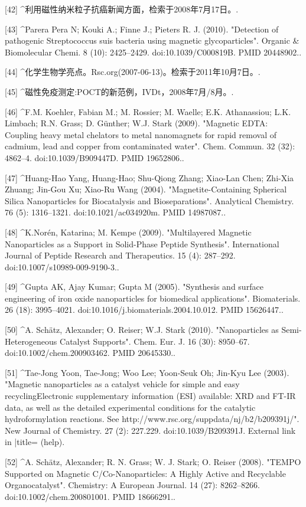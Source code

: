[42]
^利用磁性纳米粒子抗癌新闻方面，检索于2008年7月17日。.

[43]
^Parera Pera N; Kouki A.; Finne J.; Pieters R. J. (2010). "Detection of pathogenic Streptococcus suis bacteria using magnetic glycoparticles". Organic & Biomolecular Chemi. 8 (10): 2425–2429. doi:10.1039/C000819B. PMID 20448902..

[44]
^化学生物学亮点。Rsc.org(2007-06-13)。检索于2011年10月7日。.

[45]
^磁性免疫测定:POCT的新范例，IVDt，2008年7月/8月。.

[46]
^F.M. Koehler, Fabian M.; M. Rossier; M. Waelle; E.K. Athanassiou; L.K. Limbach; R.N. Grass; D. Günther; W.J. Stark (2009). "Magnetic EDTA: Coupling heavy metal chelators to metal nanomagnets for rapid removal of cadmium, lead and copper from contaminated water". Chem. Commun. 32 (32): 4862–4. doi:10.1039/B909447D. PMID 19652806..

[47]
^Huang-Hao Yang, Huang-Hao; Shu-Qiong Zhang; Xiao-Lan Chen; Zhi-Xia Zhuang; Jin-Gou Xu; Xiao-Ru Wang (2004). "Magnetite-Containing Spherical Silica Nanoparticles for Biocatalysis and Bioseparations". Analytical Chemistry. 76 (5): 1316–1321. doi:10.1021/ac034920m. PMID 14987087..

[48]
^K.Norén, Katarina; M. Kempe (2009). "Multilayered Magnetic Nanoparticles as a Support in Solid-Phase Peptide Synthesis". International Journal of Peptide Research and Therapeutics. 15 (4): 287–292. doi:10.1007/s10989-009-9190-3..

[49]
^Gupta AK, Ajay Kumar; Gupta M (2005). "Synthesis and surface engineering of iron oxide nanoparticles for biomedical applications". Biomaterials. 26 (18): 3995–4021. doi:10.1016/j.biomaterials.2004.10.012. PMID 15626447..

[50]
^A. Schätz, Alexander; O. Reiser; W.J. Stark (2010). "Nanoparticles as Semi-Heterogeneous Catalyst Supports". Chem. Eur. J. 16 (30): 8950–67. doi:10.1002/chem.200903462. PMID 20645330..

[51]
^Tae-Jong Yoon, Tae-Jong; Woo Lee; Yoon-Seuk Oh; Jin-Kyu Lee (2003). "Magnetic nanoparticles as a catalyst vehicle for simple and easy recyclingElectronic supplementary information (ESI) available: XRD and FT-IR data, as well as the detailed experimental conditions for the catalytic hydroformylation reactions. See http://www.rsc.org/suppdata/nj/b2/b209391j/". New Journal of Chemistry. 27 (2): 227.229. doi:10.1039/B209391J. External link in |title= (help).

[52]
^A. Schätz, Alexander; R. N. Grass; W. J. Stark; O. Reiser (2008). "TEMPO Supported on Magnetic C/Co-Nanoparticles: A Highly Active and Recyclable Organocatalyst". Chemistry: A European Journal. 14 (27): 8262–8266. doi:10.1002/chem.200801001. PMID 18666291..

